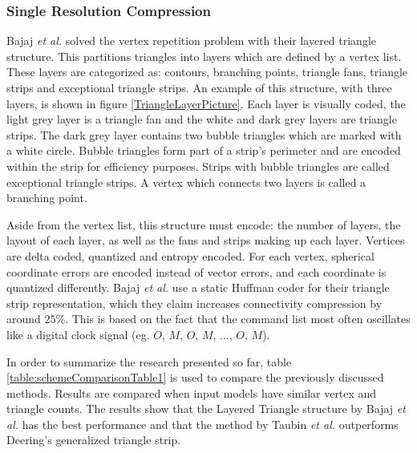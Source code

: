 \subsubsection{Single Resolution Compression} 

Bajaj \textit{et al.} \cite{Bajaj99SingleRate} solved the vertex repetition problem with their layered triangle structure. This partitions triangles into layers which are defined by a vertex list. These layers are categorized as: contours, branching points, triangle fans, triangle strips and exceptional triangle strips. 
An example of this structure, with three layers, is shown in figure \ref{TriangleLayerPicture}. Each layer is visually coded, the light grey layer is a triangle fan and the white and dark grey layers are triangle strips. The dark grey layer contains two bubble triangles which are marked with a white circle. Bubble triangles form part of a strip's perimeter and are encoded within the strip for efficiency purposes. Strips with bubble triangles are called exceptional triangle strips. A vertex which connects two layers is called a branching point.

Aside from the vertex list, this structure must encode: the number of layers, the layout of each layer, as well as the fans and strips making up each layer. Vertices are delta coded, quantized and entropy encoded. For each vertex, spherical coordinate errors are encoded instead of vector errors, and each coordinate is quantized differently. Bajaj \textit{et al.} use a static Huffman coder for their triangle strip representation, which they claim increases connectivity compression by around $25\%$. This is based on the fact that the command list most often oscillates like a digital clock signal (eg. $O$, $M$, $O$, $M$, $\dots$, $O$, $M$).


In order to summarize the research presented so far, table \ref{table:schemeComparisonTable1} is used to compare the previously discussed methods. Results are compared when input models have similar vertex and triangle counts. The results show that the Layered Triangle structure by Bajaj \textit{et al.} \cite{Bajaj99SingleRate} has the best performance and that the method by Taubin \textit{et al.} \cite{Taubin98Geometric} outperforms Deering's \cite{Deering95Geometry} generalized triangle strip.

